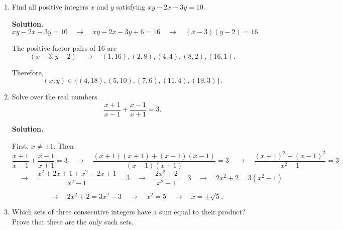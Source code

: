 \begin{enumerate}
\begin{minipage}[t]{0.38\textwidth}
			For each value of $n$, we use
			\[
			x=\frac{20}{n+1}
			\qquad\text{and}\qquad
			y=nx.
			\]
		\end{minipage}
		\hfill
		\begin{minipage}[t]{0.58\textwidth}
			\vspace{-2mm}
			\[
			\begin{array}{c|c|c|c}
				\hline
				n & n+1 & x=\dfrac{20}{n+1} & y=nx\\
				\hline
				1  & 2  & 10 & 10\\[-4pt]
				3  & 4  & 5  & 15\\[-4pt]
				4  & 5  & 4  & 16\\[-4pt]
				9  & 10 & 2  & 18\\[-4pt]
				19 & 20 & 1  & 19
			\end{array}
			\]
		\end{minipage}
		
		Therefore,
		\[
		\boxed{
			(x,y)\in
			\{(10,10),(5,15),(4,16),(2,18),(1,19)\}
		}.
		\]

		\item
		Find all positive integers $x$ and $y$ satisfying $
		xy-2x-3y=10.
		$
		
		\textbf{Solution.}
		\[
		xy-2x-3y=10
		\quad\longrightarrow\quad
		xy-2x-3y+6=16
		\quad\longrightarrow\quad
		(x-3)(y-2)=16.
		\]
		
		The positive factor pairs of $16$ are
		\[
		(x-3,y-2)
		\quad\longrightarrow\quad
		(1,16),(2,8),(4,4),(8,2),(16,1).
		\]
		
		Therefore,
		\[
		\boxed{
			(x,y)\in
			\{(4,18),(5,10),(7,6),(11,4),(19,3)\}
		}.
		\]
		
		
		\item
		Solve over the real numbers
		\[
		\frac{x+1}{x-1}+\frac{x-1}{x+1}=3.
		\]
		
		\textbf{Solution.}
		
		First,
		$
		x\neq\pm1.
		$
		Then
		\[
		\frac{x+1}{x-1}+\frac{x-1}{x+1}=3
		\quad\longrightarrow\quad
		\frac{(x+1)(x+1)+(x-1)(x-1)}
		{(x-1)(x+1)}=3
		\quad\longrightarrow\quad
		\frac{(x+1)^2+(x-1)^2}{x^2-1}=3
		\]
		\[
		\quad\longrightarrow\quad
		\frac{x^2+2x+1+x^2-2x+1}{x^2-1}=3
		\quad\longrightarrow\quad
		\frac{2x^2+2}{x^2-1}=3
		\quad\longrightarrow\quad
		2x^2+2=3(x^2-1)
		\]
		
		\[
		\quad\longrightarrow\quad
		2x^2+2=3x^2-3
		\quad\longrightarrow\quad
		x^2=5
		\quad\longrightarrow\quad
		\boxed{x=\pm\sqrt5}.
		\]

		
		\item
		Which sets of three consecutive integers have a sum equal to their product? Prove that these are the only such sets.
		

\end{enumerate}
